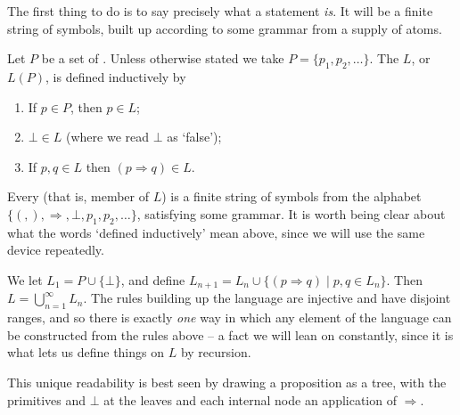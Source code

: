 \documentclass[a4paper]{scrartcl}
\begin{document}
The first thing to do is to say precisely what a statement \emph{is}. It will be a finite string of symbols, built up according to some grammar from a supply of atoms.

\begin{definition}[Language]
  Let $P$ be a set of . Unless otherwise stated we take $P = \{p_1, p_2, \dots\}$. The  $L$, or $L(P)$, is defined inductively by
  \begin{enumerate}[label=(\roman*)]
    \item If $p \in P$, then $p \in L$;
    \item $\bot \in L$ (where we read $\bot$ as `false');
    \item If $p, q \in L$ then $(p \Rightarrow q) \in L$.
  \end{enumerate}
\end{definition}

Every  (that is, member of $L$) is a finite string of symbols from the alphabet $\{(, ), \Rightarrow, \bot, p_1, p_2, \dots\}$, satisfying some grammar. It is worth being clear about what the words `defined inductively' mean above, since we will use the same device repeatedly.

We let $L_1 = P \cup \{\bot\}$, and define $L_{n + 1} = L_n \cup \{(p \Rightarrow q) \mid p, q \in L_n\}$. Then $L = \bigcup_{n = 1}^{\infty} L_n$. The rules building up the language are injective and have disjoint ranges, and so there is exactly \emph{one} way in which any element of the language can be constructed from the rules above -- a fact we will lean on constantly, since it is what lets us define things on $L$ by recursion.

This unique readability is best seen by drawing a proposition as a tree, with the primitives and $\bot$ at the leaves and each internal node an application of $\Rightarrow$.

\begin{center}
\end{center}
\end{document}

